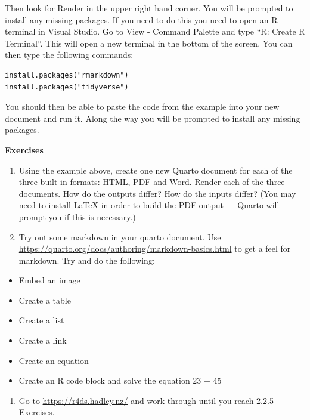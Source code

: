 \documentclass[
  letterpaper,
  DIV=11,
  numbers=noendperiod]{scrreprt}
\providecommand{\tightlist}{%
  \setlength{\itemsep}{0pt}\setlength{\parskip}{0pt}}\usepackage{longtable,booktabs,array}
\begin{document}
Then look for Render in the upper right hand corner. You will be
prompted to install any missing packages. If you need to do this you
need to open an R terminal in Visual Studio. Go to View - Command
Palette and type ``R: Create R Terminal''. This will open a new terminal
in the bottom of the screen. You can then type the following commands:

\begin{verbatim}
install.packages("rmarkdown")
install.packages("tidyverse")
\end{verbatim}

You should then be able to paste the code from the example into your new
document and run it. Along the way you will be prompted to install any
missing packages.

\textbf{Exercises}

\begin{enumerate}
\def\labelenumi{\arabic{enumi}.}
\item
  Using the example above, create one new Quarto document for each of
  the three built-in formats: HTML, PDF and Word. Render each of the
  three documents. How do the outputs differ? How do the inputs differ?
  (You may need to install LaTeX in order to build the PDF output ---
  Quarto will prompt you if this is necessary.)
\item
  Try out some markdown in your quarto document. Use
  \url{https://quarto.org/docs/authoring/markdown-basics.html} to get a
  feel for markdown. Try and do the following:
\end{enumerate}

\begin{itemize}
\tightlist
\item
  Embed an image
\item
  Create a table
\item
  Create a list
\item
  Create a link
\item
  Create an equation
\item
  Create an R code block and solve the equation 23 + 45
\end{itemize}

\begin{enumerate}
\def\labelenumi{\arabic{enumi}.}
\setcounter{enumi}{2}
\tightlist
\item
  Go to \url{https://r4ds.hadley.nz/} and work through until you reach
  2.2.5 Exercises.
\end{enumerate}

\end{document}
